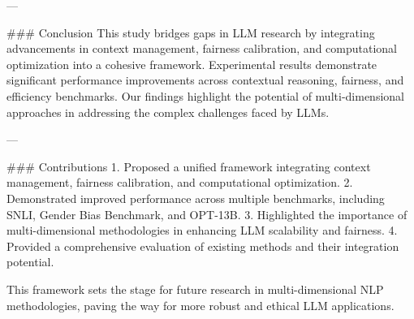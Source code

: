 ---

### Conclusion  
This study bridges gaps in LLM research by integrating advancements in context management, fairness calibration, and computational optimization into a cohesive framework. Experimental results demonstrate significant performance improvements across contextual reasoning, fairness, and efficiency benchmarks. Our findings highlight the potential of multi-dimensional approaches in addressing the complex challenges faced by LLMs.

---

### Contributions  
1. Proposed a unified framework integrating context management, fairness calibration, and computational optimization.  
2. Demonstrated improved performance across multiple benchmarks, including SNLI, Gender Bias Benchmark, and OPT-13B.  
3. Highlighted the importance of multi-dimensional methodologies in enhancing LLM scalability and fairness.  
4. Provided a comprehensive evaluation of existing methods and their integration potential.  

This framework sets the stage for future research in multi-dimensional NLP methodologies, paving the way for more robust and ethical LLM applications.